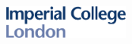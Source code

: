 
\begin{titlepage}

\newcommand{\HRule}{\rule{\linewidth}{0.5mm}} %



\includegraphics[width = 4cm]{./figures/imperial}\\[0.5cm] 

\center %





{ \huge \bfseries \reporttitle}\\ %

 

~
\vfill
\reportauthor


\end{titlepage}
